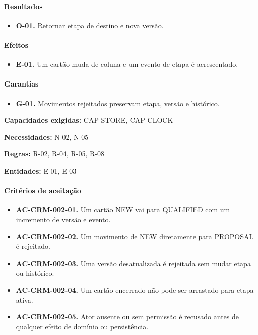 \documentclass[10pt,a4paper]{article}
\begin{document}
\paragraph{Resultados}

\begin{itemize}

\item \textbf{O-01.} Retornar etapa de destino e nova versão.

\end{itemize}

\paragraph{Efeitos}

\begin{itemize}

\item \textbf{E-01.} Um cartão muda de coluna e um evento de etapa é acrescentado.

\end{itemize}

\paragraph{Garantias}

\begin{itemize}

\item \textbf{G-01.} Movimentos rejeitados preservam etapa, versão e histórico.

\end{itemize}

\textbf{Capacidades exigidas:} CAP-STORE, CAP-CLOCK

\textbf{Necessidades:} N-02, N-05

\textbf{Regras:} R-02, R-04, R-05, R-08

\textbf{Entidades:} E-01, E-03

\paragraph{Critérios de aceitação}

\begin{itemize}

\item \textbf{AC-CRM-002-01.} Um cartão NEW vai para QUALIFIED com um incremento de versão e evento.

\item \textbf{AC-CRM-002-02.} Um movimento de NEW diretamente para PROPOSAL é rejeitado.

\item \textbf{AC-CRM-002-03.} Uma versão desatualizada é rejeitada sem mudar etapa ou histórico.

\item \textbf{AC-CRM-002-04.} Um cartão encerrado não pode ser arrastado para etapa ativa.

\item \textbf{AC-CRM-002-05.} Ator ausente ou sem permissão é recusado antes de qualquer efeito de domínio ou persistência.

\end{itemize}
\end{document}
